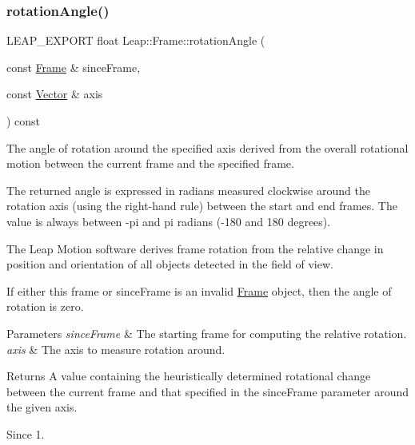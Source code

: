 \subsubsection{\texorpdfstring{rotation\+Angle()}{rotationAngle()}\hspace{0.1cm}{\footnotesize\ttfamily [2/2]}}
{\footnotesize\ttfamily L\+E\+A\+P\+\_\+\+E\+X\+P\+O\+RT float Leap\+::\+Frame\+::rotation\+Angle (\begin{DoxyParamCaption}\item[{const \hyperlink{class_leap_1_1_frame}{Frame} \&}]{since\+Frame,  }\item[{const \hyperlink{struct_leap_1_1_vector}{Vector} \&}]{axis }\end{DoxyParamCaption}) const}

The angle of rotation around the specified axis derived from the overall rotational motion between the current frame and the specified frame.

The returned angle is expressed in radians measured clockwise around the rotation axis (using the right-\/hand rule) between the start and end frames. The value is always between -\/pi and pi radians (-\/180 and 180 degrees).


\begin{DoxyCodeInclude}
\end{DoxyCodeInclude}


The Leap Motion software derives frame rotation from the relative change in position and orientation of all objects detected in the field of view.

If either this frame or since\+Frame is an invalid \hyperlink{class_leap_1_1_frame}{Frame} object, then the angle of rotation is zero.


\begin{DoxyParams}{Parameters}
{\em since\+Frame} & The starting frame for computing the relative rotation. \\
\hline
{\em axis} & The axis to measure rotation around. \\
\hline
\end{DoxyParams}
\begin{DoxyReturn}{Returns}
A value containing the heuristically determined rotational change between the current frame and that specified in the since\+Frame parameter around the given axis. 
\end{DoxyReturn}
\begin{DoxySince}{Since}
1. 
\end{DoxySince}
\mbox{\label{class_leap_1_1_frame_ae79eca6afb867d7bc6c5a9b2b6caae0b}} 

